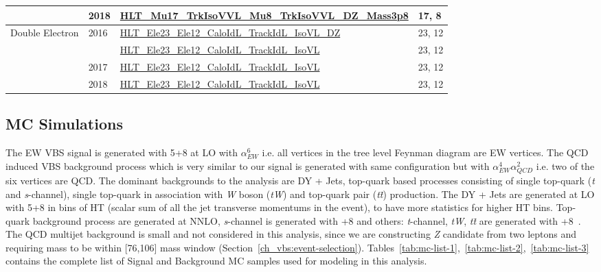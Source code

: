 \begin{table}[!ht]
{\begin{tabular}{clll}
      \cmidrule(lr){2-4}
              & \multirow{1}{*}{2018} & \url{HLT_Mu17_TrkIsoVVL_Mu8_TrkIsoVVL_DZ_Mass3p8} & 17, 8  \GeV{}       \\
      \midrule
      \multirow{4}{*}{Double Electron}
              & \multirow{2}{*}{2016} & \url{HLT_Ele23_Ele12_CaloIdL_TrackIdL_IsoVL_DZ}   & 23, 12 \GeV{}       \\
              &                       & \url{HLT_Ele23_Ele12_CaloIdL_TrackIdL_IsoVL}      & 23, 12 \GeV{}       \\
      \cmidrule(lr){2-4}
              & \multirow{1}{*}{2017} & \url{HLT_Ele23_Ele12_CaloIdL_TrackIdL_IsoVL}      & 23, 12 \GeV{}       \\
      \cmidrule(lr){2-4}
              & \multirow{1}{*}{2018} & \url{HLT_Ele23_Ele12_CaloIdL_TrackIdL_IsoVL}      & 23, 12 \GeV{}       \\
      \bottomrule
    \end{tabular}}\label{tab:hlt-paths}
\end{table}

\subsection{
  MC Simulations
}

The \gls{EW} \gls{VBS} signal is
generated with \MADGRAPH{}5+\PYTHIA{}8 at \gls{LO} with \( \alpha_{EW}^{6} \)
i.e.
all vertices in the tree level Feynman diagram are \gls{EW} vertices.
The \gls{QCD} induced \gls{VBS} background process which is very
similar to our signal is generated with same configuration
but with \( \alpha_{EW}^{4} \alpha_{QCD}^{2} \) i.e.
two of the six vertices are \gls{QCD}. The dominant backgrounds to the analysis
are \gls{DY} + Jets, top-quark based processes consisting of
single top-quark (\textit{t} and \textit{s}-channel),
single top-quark in association with \textit{W} boson (\textit{tW}) and top-quark pair (\textit{t}\textit{\=t}) production.
The \gls{DY} + Jets are generated at \gls{LO} with \MADGRAPH{}5+\PYTHIA{}8
in bins of HT
(scalar sum of all the jet transverse momentums in the event), to have more statistics
for higher HT bins. Top-quark background process are generated at \gls{NNLO},
\textit{s}-channel is generated with \MGvATNLO+\PYTHIA{}8 and others:
\textit{t}-channel, \textit{tW}, \textit{t}\textit{\=t} are generated with \POWHEG{}+\PYTHIA{}8~\cite{Oleari2010}. The QCD
multijet background is small and not considered in this analysis, since we
are constructing \textit{Z} candidate
from two leptons and requiring mass to be within [76,106] \GeV{} mass window (Section~\ref{ch_vbs:event-selection}).
Tables~\ref{tab:mc-list-1},~\ref{tab:mc-list-2},~\ref{tab:mc-list-3} contains
the complete list of Signal and Background MC samples used for modeling in this analysis.

